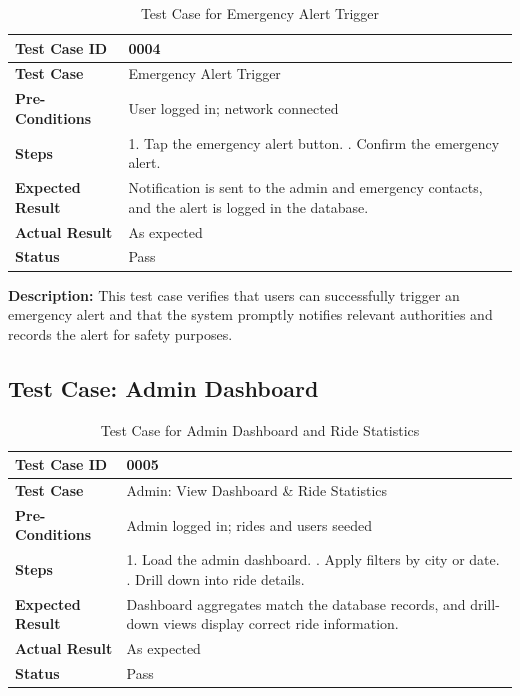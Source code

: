 \begin{table}[H]
\centering

\label{tab:testcase-emergency-alert}
\renewcommand{\arraystretch}{1.2}
\begin{tabular}{|>{\bfseries}l|p{10cm}|}
\hline
Test Case ID & 0004 \\ \hline
Test Case & Emergency Alert Trigger \\ \hline
Pre-Conditions & User logged in; network connected \\ \hline
Steps &
1. Tap the emergency alert button. \newline
2. Confirm the emergency alert. \\ \hline
Expected Result & Notification is sent to the admin and emergency contacts, and the alert is logged in the database. \\ \hline
Actual Result & As expected \\ \hline
Status & Pass \\ \hline
\end{tabular}
\caption{Test Case for Emergency Alert Trigger}
\end{table}

\noindent
\textbf{Description:} This test case verifies that users can successfully trigger an emergency alert and that the system promptly notifies relevant authorities and records the alert for safety purposes.


\subsection{Test Case: Admin Dashboard}

\begin{table}[H]
\centering
\label{tab:testcase-admin-dashboard}
\renewcommand{\arraystretch}{1.2}
\begin{tabular}{|>{\bfseries}l|p{10cm}|}
\hline
Test Case ID & 0005 \\ \hline
Test Case & Admin: View Dashboard \& Ride Statistics \\ \hline
Pre-Conditions & Admin logged in; rides and users seeded \\ \hline
Steps &
1. Load the admin dashboard. \newline
2. Apply filters by city or date. \newline
3. Drill down into ride details. \\ \hline
Expected Result & Dashboard aggregates match the database records, and drill-down views display correct ride information. \\ \hline
Actual Result & As expected \\ \hline
Status & Pass \\ \hline
\end{tabular}
\caption{Test Case for Admin Dashboard and Ride Statistics}
\end{table}

